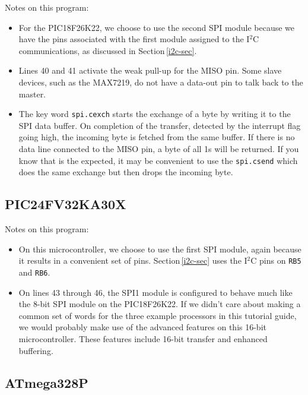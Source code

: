 \documentclass[12pt,a4paper]{article}
\newcommand{\code}[2]{
 \hrulefill
 \scriptsize
 
 \hrulefill
 \vspace{2em}
 \normalsize
}
\begin{document}
\medskip\noindent
\code{}{../pic18/spi2-base-k22.txt}

\noindent
Notes on this program:
\begin{itemize}
  \item For the PIC18F26K22, we choose to use the second SPI module 
    because we have the pins associated with the first module assigned to the I$^2$C communications,
    as discussed in Section\,\ref{i2c-sec}.
  \item Lines 40 and 41 activate the weak pull-up for the MISO pin.
    Some slave devices, such as the MAX7219, do not have a data-out pin to talk back to the master.
  \item The key word \verb!spi.cexch! starts the exchange of a byte by writing it to the SPI data buffer.
    On completion of the transfer, detected by the interrupt flag going high,
    the incoming byte is fetched from the same buffer.
    If there is no data line connected to the MISO pin, a byte of all 1s will be returned.
    If you know that is the expected, it may be convenient to use the \verb!spi.csend! which
    does the same exchange but then drops the incoming byte.
\end{itemize}

\subsection{PIC24FV32KA30X}
\code{}{../pic24/spi1-base-pic24fv32ka302.txt}

\noindent
Notes on this program:
\begin{itemize}
  \item On this microcontroller, we choose to use the first SPI module, again because
    it results in a convenient set of pins.
    Section\,\ref{i2c-sec} uses the I$^2$C pins on \verb!RB5! and \verb!RB6!.
  \item On lines 43 through 46, the SPI1 module is configured to behave much like the 
    8-bit SPI module on the PIC18F26K22.
    If we didn't care about making a common set of words for the three example processors
    in this tutorial guide, 
    we would probably make use of the advanced features on this 16-bit microcontroller.
    These features include 16-bit transfer and enhanced buffering.
\end{itemize}

\subsection{ATmega328P}
\code{}{../avr8-2016/spi-base-avr.txt}
\end{document}
